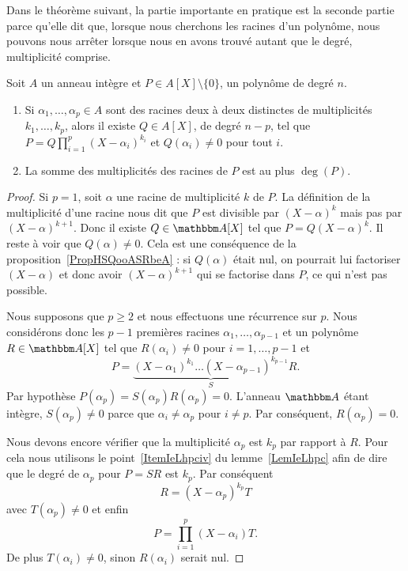 Dans le théorème suivant, la partie importante en pratique est la seconde partie parce qu'elle dit que, lorsque nous cherchons les racines d'un polynôme, nous pouvons nous arrêter lorsque nous en avons trouvé autant que le degré, multiplicité comprise.
\begin{theorem} \label{ThoSVZooMpNANi}
    Soit \( A\) un anneau intègre
  et \( P\in A[X]\setminus\{ 0 \}\), un polynôme de degré \( n\). 

  \begin{enumerate}
      \item
  Si \( \alpha_1,\ldots, \alpha_p\in A\) sont des racines deux à deux
  distinctes de multiplicités \( k_1,\ldots, k_p\), alors il existe \(
  Q\in A[X]\), de degré \( n-p\), tel que \(
  P=Q\prod_{i=1}^p(X-\alpha_i)^{k_i}\) et \( Q(\alpha_i)\neq 0\) pour
  tout $i$.
  \item     \label{ITEMooWGOBooGApPOo}
    La somme des multiplicités des racines de \( P\) est au plus \( \deg(P)\).
  \end{enumerate}
\end{theorem}

\begin{proof}
    Si \( p=1\), soit \( \alpha\) une racine de multiplicité \( k\) de \( P\). La définition de la multiplicité d'une racine nous dit que \( P\) est divisible par \( (X-\alpha)^k\) mais pas par \( (X-\alpha)^{k+1}\). Donc il existe \( Q\in \eA[X]\) tel que \( P=Q(X-\alpha)^k\). Il reste à voir que \( Q(\alpha)\neq 0\). Cela est une conséquence de la proposition~\ref{PropHSQooASRbeA} : si \( Q(\alpha)\) était nul, on pourrait lui factoriser \( (X-\alpha)\) et donc avoir \( (X-\alpha)^{k+1}\) qui se factorise dans \( P\), ce qui n'est pas possible.

    Nous supposons que \( p\geq 2\) et nous effectuons une récurrence sur \( p\). Nous considérons donc les \( p-1\) premières racines \( \alpha_1,\ldots, \alpha_{p-1}\) et un polynôme \( R\in\eA[X]\) tel que \( R(\alpha_i)\neq 0\) pour \( i=1,\ldots, p-1\) et
    \begin{equation}
        P=\underbrace{(X-\alpha_1)^{k_1}\ldots (X-\alpha_{p-1})^{k_{p-1}}}_SR.
    \end{equation}
    Par hypothèse \( P(\alpha_p)=S(\alpha_p)R(\alpha_p)=0\). L'anneau \( \eA\) étant intègre, \( S(\alpha_p)\neq 0\) parce que \( \alpha_i\neq \alpha_p\) pour \( i\neq p\). Par conséquent, \( R(\alpha_p)=0\).

    Nous devons encore vérifier que la multiplicité \( \alpha_p\) est \( k_p\) par rapport à \( R\). Pour cela nous utilisons le point~\ref{ItemIeLhpciv} du lemme~\ref{LemIeLhpc} afin de dire que le degré de \( \alpha_p\) pour \( P=SR\) est \( k_p\). Par conséquent
    \begin{equation}
        R=(X-\alpha_p)^{k_p}T
    \end{equation}
    avec \( T(\alpha_p)\neq 0\) et enfin
    \begin{equation}
        P=\prod_{i=1}^p(X-\alpha_i)T.
    \end{equation}
    De plus \( T(\alpha_i)\neq 0\), sinon \( R(\alpha_i)\) serait nul.
\end{proof}

